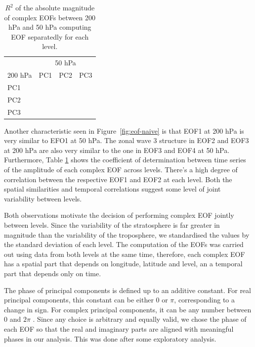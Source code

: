 \documentclass[smallextended]{svjour3}       %
\begin{document}
\begin{table}

\caption{\label{tab:corr-ceof-splitted}$R^2$ of the absolute magnitude of complex EOFs between 200 hPa and 50 hPa computing EOF separatedly for each level.}
\centering
\begin{tabular}[t]{l>{}r>{}r>{}r}
\toprule
\multicolumn{1}{c}{} & \multicolumn{3}{c}{50 hPa} \\
\cmidrule(l{3pt}r{3pt}){2-4}
200 hPa & PC1 & PC2 & PC3\\
\midrule
PC1 & \cellcolor[HTML]{E1C0BB}{\textcolor{black}{0.28}} & \cellcolor[HTML]{FDFAFA}{\textcolor{black}{0.02}} & \cellcolor[HTML]{FDFAFA}{\textcolor{black}{0.02}}\\
PC2 & \cellcolor[HTML]{FFFFFF}{\textcolor{black}{0.00}} & \cellcolor[HTML]{BB7A73}{\textcolor{white}{0.60}} & \cellcolor[HTML]{FDFAFA}{\textcolor{black}{0.02}}\\
PC3 & \cellcolor[HTML]{FFFFFF}{\textcolor{black}{0.00}} & \cellcolor[HTML]{FFFFFF}{\textcolor{black}{0.00}} & \cellcolor[HTML]{FDFCFC}{\textcolor{black}{0.01}}\\
\bottomrule
\end{tabular}
\end{table}

Another characteristic seen in Figure~\ref{fig:eof-naive} is that EOF1 at 200 hPa is very similar to EFO1 at 50 hPa. The zonal wave 3 structure in EOF2 and EOF3 at 200 hPa are also very similar to the one in EOF3 and EOF4 at 50 hPa. Furthermore, Table \ref{tab:corr-ceof-splitted} shows the coefficient of determination between time series of the amplitude of each complex EOF across levels. There's a high degree of correlation between the respective EOF1 and EOF2 at each level. Both the spatial similarities and temporal correlations suggest some level of joint variability between levels.

Both observations motivate the decision of performing complex EOF jointly between levels. Since the variability of the stratosphere is far greater in magnitude than the variability of the troposphere, we standardised the values by the standard deviation of each level. The computation of the EOFs was carried out using data from both levels at the same time, therefore, each complex EOF has a spatial part that depends on longitude, latitude and level, an a temporal part that depends only on time.

The phase of principal components is defined up to an additive constant. For real principal components, this constant can be either 0 or \(\pi\), corresponding to a change in sign. For complex principal components, it can be any number between 0 and \(2\pi\) \citep{horel1984}. Since any choice is arbitrary and equally valid, we chose the phase of each EOF so that the real and imaginary parts are aligned with meaningful phases in our analysis. This was done after some exploratory analysis.
\end{document}
